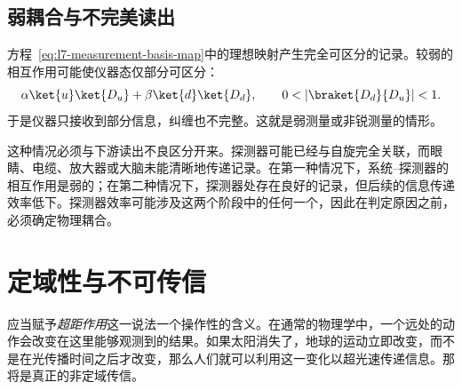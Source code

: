 \begin{classroomqa}
\end{classroomqa}

\begin{classroomqa}
\end{classroomqa}

\subsection{弱耦合与不完美读出}

方程~\eqref{eq:l7-measurement-basis-map}中的理想映射产生完全可区分的记录。较弱的相互作用可能使仪器态仅部分可区分：
\begin{equation}
\alpha\ket{u}\ket{D_u}
+\beta\ket{d}\ket{D_d},
\qquad
0<|\braket{D_d}{D_u}|<1.
\label{eq:l7-weak-measurement}
\end{equation}
于是仪器只接收到部分信息，纠缠也不完整。这就是弱测量或非锐测量的情形。

这种情况必须与下游读出不良区分开来。探测器可能已经与自旋完全关联，而眼睛、电缆、放大器或大脑未能清晰地传递记录。在第一种情况下，系统--探测器的相互作用是弱的；在第二种情况下，探测器处存在良好的记录，但后续的信息传递效率低下。探测器效率可能涉及这两个阶段中的任何一个，因此在判定原因之前，必须确定物理耦合。

\begin{classroomqa}
\end{classroomqa}

\section{定域性与不可传信}

应当赋予\emph{超距作用}这一说法一个操作性的含义。在通常的物理学中，一个远处的动作会改变在这里能够观测到的结果。如果太阳消失了，地球的运动立即改变，而不是在光传播时间之后才改变，那么人们就可以利用这一变化以超光速传递信息。那将是真正的非定域传信。


